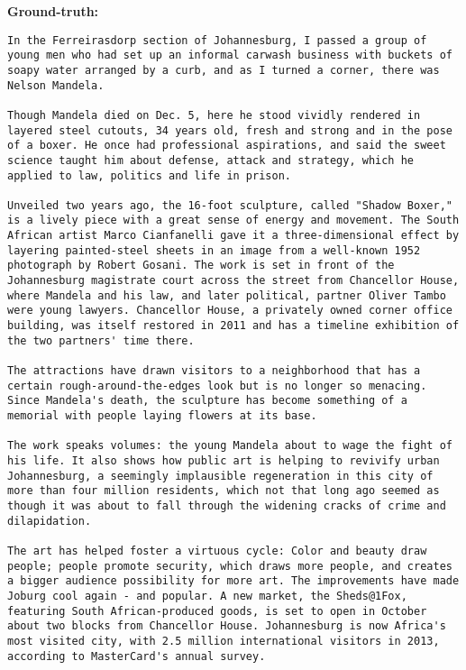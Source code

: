 {\bf\ttfamily Ground-truth: }
\begin{lstlisting}
In the Ferreirasdorp section of Johannesburg, I passed a group of young men who had set up an informal carwash business with buckets of soapy water arranged by a curb, and as I turned a corner, there was Nelson Mandela.

Though Mandela died on Dec. 5, here he stood vividly rendered in layered steel cutouts, 34 years old, fresh and strong and in the pose of a boxer. He once had professional aspirations, and said the sweet science taught him about defense, attack and strategy, which he applied to law, politics and life in prison.

Unveiled two years ago, the 16-foot sculpture, called "Shadow Boxer," is a lively piece with a great sense of energy and movement. The South African artist Marco Cianfanelli gave it a three-dimensional effect by layering painted-steel sheets in an image from a well-known 1952 photograph by Robert Gosani. The work is set in front of the Johannesburg magistrate court across the street from Chancellor House, where Mandela and his law, and later political, partner Oliver Tambo were young lawyers. Chancellor House, a privately owned corner office building, was itself restored in 2011 and has a timeline exhibition of the two partners' time there.

The attractions have drawn visitors to a neighborhood that has a certain rough-around-the-edges look but is no longer so menacing. Since Mandela's death, the sculpture has become something of a memorial with people laying flowers at its base.

The work speaks volumes: the young Mandela about to wage the fight of his life. It also shows how public art is helping to revivify urban Johannesburg, a seemingly implausible regeneration in this city of more than four million residents, which not that long ago seemed as though it was about to fall through the widening cracks of crime and dilapidation.

The art has helped foster a virtuous cycle: Color and beauty draw people; people promote security, which draws more people, and creates a bigger audience possibility for more art. The improvements have made Joburg cool again - and popular. A new market, the Sheds@1Fox, featuring South African-produced goods, is set to open in October about two blocks from Chancellor House. Johannesburg is now Africa's most visited city, with 2.5 million international visitors in 2013, according to MasterCard's annual survey.


\end{lstlisting}
